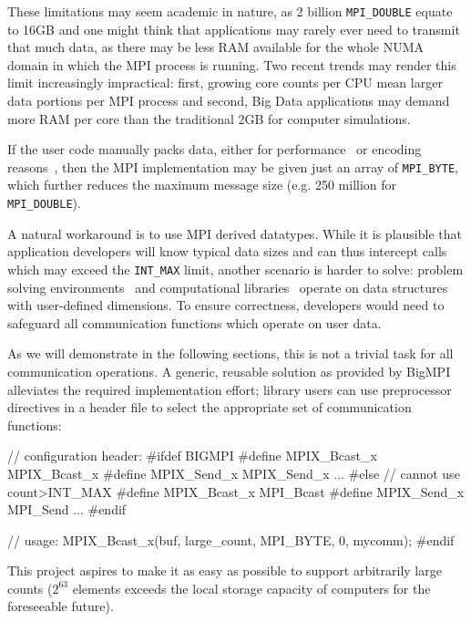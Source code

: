 These limitations may seem academic in nature, as 2 billion
\texttt{MPI\_DOUBLE} equate to 16GB and one might think that
applications may rarely ever need to transmit that much data, as there
may be less RAM available for the whole NUMA domain in which the MPI
process is running. Two recent trends may render this limit
increasingly impractical: first, growing core counts per CPU mean
larger data portions per MPI process and second, Big Data applications
may demand more RAM per core than the traditional 2GB for computer
simulations.

If the user code manually packs data, either for
performance~\cite{jenkins2012enabling} or encoding
reasons~\cite{boostmpi}, then the MPI implementation may be given just
an array of \texttt{MPI\_BYTE}, which further reduces the maximum
message size (e.g. 250 million for \texttt{MPI\_DOUBLE}).

A natural workaround is to use MPI derived datatypes. While it is
plausible that application developers will know typical data sizes and
can thus intercept calls which may exceed the \texttt{INT\_MAX} limit,
another scenario is harder to solve: problem solving
environments~\cite{cactus:SC01, gromacs} and computational
libraries~\cite{physis, libgeodecomp} operate on data structures with
user-defined dimensions. To ensure correctness, developers would need
to safeguard all communication functions which operate on user data.

As we will demonstrate in the following sections, this is not a
trivial task for all communication operations. A generic, reusable
solution as provided by BigMPI alleviates the required implementation
effort; library users can use preprocessor directives in a header file
to select the appropriate set of communication functions:

\begin{code}
// configuration header:
#ifdef BIGMPI
#define MPIX_Bcast_x MPIX_Bcast_x
#define MPIX_Send_x MPIX_Send_x
...
#else // cannot use count>INT_MAX
#define MPIX_Bcast_x MPI_Bcast
#define MPIX_Send_x MPI_Send
...
#endif

// usage:
    MPIX_Bcast_x(buf, large_count, MPI_BYTE, 0, mycomm);
#endif
\end{code}

This project aspires to make it as easy as possible to support arbitrarily
large counts ($2^{63}$ elements exceeds the local storage capacity of computers
for the foreseeable future).


